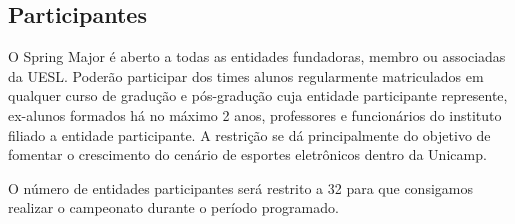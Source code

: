 \subsection{Participantes}

O Spring Major é aberto a todas as entidades fundadoras, membro ou associadas da UESL. Poderão participar dos times alunos regularmente matriculados em qualquer curso de gradução e pós-gradução cuja entidade participante represente, ex-alunos formados há no máximo 2 anos, professores e funcionários do instituto filiado a entidade participante. A restrição se dá principalmente do objetivo de fomentar o crescimento do cenário de esportes eletrônicos dentro da Unicamp.

O número de entidades participantes será restrito a 32 para que consigamos realizar o campeonato durante o período programado.
